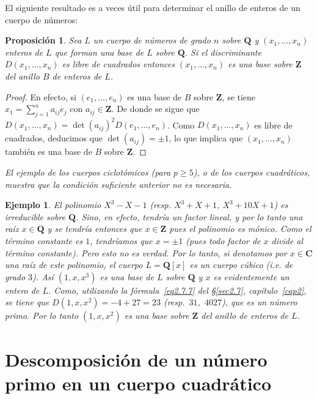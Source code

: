 \documentclass[oneside,bibtotoc,leqno,spanish]{amsbook}
\newcommand{\QQ}{\mathbf{Q}}
\newcommand{\ZZ}{\mathbf{Z}}
\newcommand{\CC}{\mathbf{C}}
\numberwithin{equation}{section}
\newenvironment{comm}%
	{\begin{trivlist}\item\small\itshape}
	{\end{trivlist}}
\theoremstyle{defi}
\theoremstyle{note}
\newtheorem{proposition}{Proposici\'on}
\theoremstyle{rem}
\newtheorem*{example*}{Ejemplo}
\numberwithin{theorem}{section}
\numberwithin{proposition}{section}
\numberwithin{definition}{section}
\numberwithin{lemma}{section}
\numberwithin{corollary}{section}
\numberwithin{example}{section}
\numberwithin{footnote}{section}%
\begin{document}
El siguiente resultado es a veces \'util para determinar el anillo de enteros de un cuerpo de n\'umeros:

\begin{proposition}
Sea $L$ un cuerpo de n\'umeros de grado $n$ sobre $\QQ$ y $(x_{1},\dots,x_{n})$ enteros de $L$
que forman una base de $L$ sobre $\QQ$. Si el discriminante $D(x_{1},\dots,x_{n})$ es libre de cuadrados
entonces $(x_{1},\dots,x_{n})$ es una base sobre $\ZZ$ del anillo $B$ de enteros de $L$.
\end{proposition}

\begin{proof}
En efecto, si $(e_{1},\dots,e_{n})$ es una base de $B$ sobre $\ZZ$, se tiene $x_{1}=\sum_{j=1}^{n}a_{ij}e_{j}$
con $a_{ij}\in\ZZ$. De donde se sigue que $D(x_{1},\dots,x_{n})=\det(a_{ij})^{2}D(e_{1},\dots,e_{n})$.
Como $D(x_{1},\dots,x_{n})$ es libre de cuadrados, deducimos que $\det(a_{ij})=\pm 1$, lo que implica que
$(x_{1},\dots,x_{n})$ tambi\'en es una base de $B$ sobre $\ZZ$.
\end{proof}

\begin{comm}
El ejemplo de los cuerpos ciclot\'omicos (para $p\geq 5$), o de los cuerpos cuadr\'aticos, muestra que
la condici\'on suficiente anterior no es necesaria.
\end{comm}

\begin{example*}
El polinomio $X^{3}-X-1$ (resp. $X^{3}+X+1$, $X^{3}+10X+1$) es {\em irreducible} sobre $\QQ$.
Sino, en efecto, tendr\'ia un factor lineal, y por lo tanto una ra\'iz $x\in\QQ$ y se tendr\'ia entonces
que $x\in\ZZ$ pues el polinomio es m\'onico. Como el t\'ermino constante es $1$, tendr\'iamos que
$x=\pm 1$ (pues todo factor de $x$ divide al t\'ermino constante). Pero esto no es verdad. Por lo tanto,
si denotamos por $x\in\CC$ una ra\'iz de este polinomio, el cuerpo $L = \QQ[x]$ es un {\em cuerpo c\'ubico}
(i.e. de grado $3$). As\'i $(1,x,x^{3})$ es una base de $L$ sobre $\QQ$ y $x$ es evidentemente un entero de
$L$. Como, utilizando la f\'ormula~\eqref{eq2.7.7} del \S\ref{sec2.7}, cap\'itulo~\ref{cap2}, se tiene
que $D(1,x,x^{2}) = -4+27 = 23$ (resp.~$31$,~$4027$), que es un n\'umero primo.  Por lo tanto
$(1,x,x^{2})$ es una base sobre $\ZZ$ del anillo de enteros de $L$.
\end{example*}

\section{Descomposici\'on de un n\'umero primo en un cuerpo cuadr\'atico}\label{sec5.4}
\end{document}
